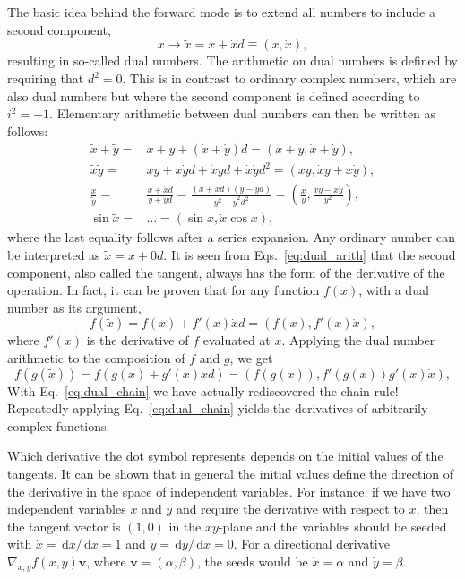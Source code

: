 \documentclass{article}
\newcommand{\D}{\,\textrm{d}}
\begin{document}
The basic idea behind the forward mode is to extend all numbers to include a second component,
\begin{equation}
  \label{eq:ddouble}
  x \rightarrow \tilde x = x + \dot x d \equiv (x,\dot x),
\end{equation}
resulting in so-called dual numbers. The arithmetic on dual numbers is defined by requiring that $d^2=0$. This is in contrast to ordinary complex numbers, which are also dual numbers but where the second component is defined according to $i^2=-1$. Elementary arithmetic between dual numbers can then be written as follows:
\begin{equation}
  \label{eq:dual_arith}
  \begin{split}
    \tilde x + \tilde y =& x + y + (\dot x + \dot y)d = (x+y, \dot x +
    \dot y), \\
    \tilde x\tilde y =& xy + x\dot yd + \dot xyd + \dot x\dot yd^2 =
    (xy, \dot xy + x\dot y), \\
    \frac{\tilde x}{\tilde y} =& \frac{x + \dot xd}{y + \dot yd} =
    \frac{(x + \dot xd)(y - \dot yd)}{y^2 - \dot y^2 d^2} =
    \left(\frac{x}{y}, \frac{\dot xy - x\dot y}{y^2} \right), \\
    \sin\tilde x =& \ldots = (\sin x, \dot x\cos x),
  \end{split}
\end{equation}
where the last equality follows after a series expansion. Any ordinary number can be interpreted as $\tilde x=x+0d$. It is seen from Eqs.~\eqref{eq:dual_arith} that the second component, also called the tangent, always has the form of the derivative of the operation. In fact, it can be proven that for any function $f(x)$, with a dual number as its argument,
\begin{equation}
  \label{eq:dual_general}
  f(\tilde x) = f(x) + f'(x)\dot xd = \left( f(x), f'(x)\dot x
  \right),
\end{equation}
where $f'(x)$ is the derivative of $f$ evaluated at $x$. Applying the dual number arithmetic to the composition of $f$ and $g$, we get
\begin{equation}
  \label{eq:dual_chain}
  f(g(\tilde x)) = f(g(x) + g'(x)\dot xd) = \left( f(g(x)),
    f'(g(x))g'(x)\dot x \right),
\end{equation}
With Eq.~\eqref{eq:dual_chain} we have actually rediscovered the chain rule! Repeatedly applying Eq.~\eqref{eq:dual_chain} yields the derivatives of arbitrarily complex functions.

Which derivative the dot symbol represents depends on the initial values of the tangents. It can be shown that in general the initial values define the direction of the derivative in the space of independent variables. For instance, if we have two independent variables $x$ and $y$ and require the derivative with respect to $x$, then the tangent vector is $(1,0)$ in the $xy$-plane and the variables should be seeded with $\dot x = \D x/\D x = 1$ and $\dot y = \D y/\D x = 0$. For a directional derivative $\nabla_{x,y}f(x,y) \bm v$, where $\bm v = (\alpha, \beta)$, the seeds would be $\dot x = \alpha$ and $\dot y = \beta$.
\end{document}
